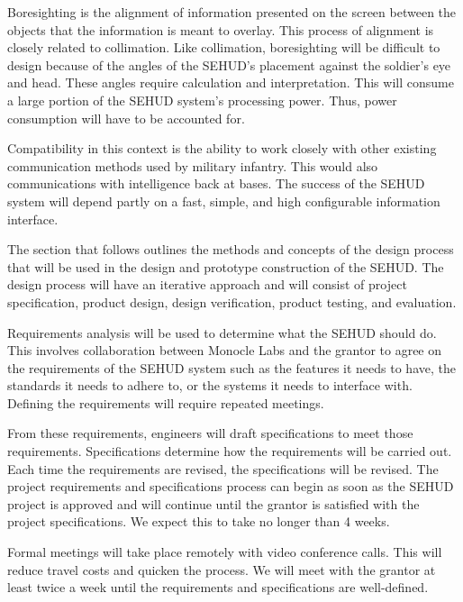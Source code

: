 Boresighting is the alignment of information presented on the screen between
the objects that the information is meant to overlay. This process of
alignment is closely related to collimation. Like collimation, boresighting
will be difficult to design because of the angles of the SEHUD's placement
against the soldier's eye and head. These angles require calculation
and interpretation. This will consume a large portion of the SEHUD system's
processing power. Thus, power consumption will have to be accounted for.


Compatibility in this context is the ability to work closely with other
existing communication methods used by military infantry. This would also
communications with intelligence back at bases. The success of the SEHUD
system will depend partly on a fast, simple, and high configurable
information interface.



The section that follows outlines the methods and concepts of the design
process that will be used in the design and prototype construction of the
SEHUD. The design process will have an iterative approach and will consist of
project specification, product design, design verification, product testing,
and evaluation.














Requirements analysis will be used to determine what the SEHUD should do.
This involves collaboration between Monocle Labs and the grantor to agree on
the requirements of the SEHUD system such as the features it needs to have,
the standards it needs to adhere to, or the systems it needs to interface
with. Defining the requirements will require repeated meetings.

From these requirements, engineers will draft specifications to meet those
requirements. Specifications determine how the requirements will be
carried out. Each time the requirements are revised, the specifications will
be revised. The project requirements and specifications process can begin as
soon as the SEHUD project is approved and will continue until the grantor is
satisfied with the project specifications. We expect this to take no longer
than 4 weeks.

Formal meetings will take place remotely with video conference calls. This
will reduce travel costs and quicken the process. We will meet with the
grantor at least twice a week until the requirements and specifications are
well-defined.

